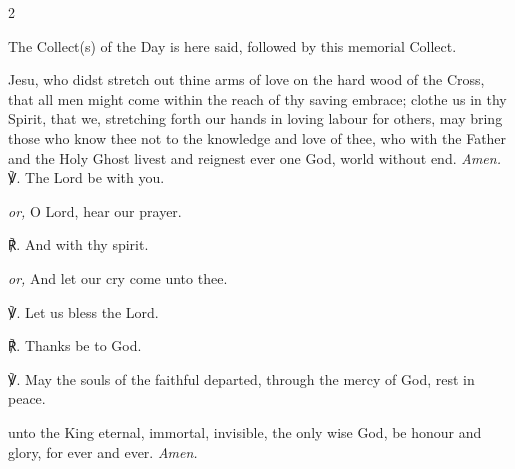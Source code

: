 \begin{multicols}{2}
\begin{rubric}
	The Collect(s) of the Day is here said, followed by this memorial Collect.
\end{rubric}

 Jesu, who didst stretch out thine arms of love on the hard wood of the Cross, that all men might come within the reach of thy saving embrace; clothe us in thy Spirit, that we, stretching forth our hands in loving labour for others, may bring those who know thee not to the knowledge and love of thee, who with the Father and the Holy Ghost livest and reignest ever one God, world without end. \textit{Amen.}\\

℣. The Lord be with you.\par
\textit{or,} O Lord, hear our prayer.

℟. And with thy spirit.\par
\textit{or,} And let our cry come unto thee.

℣. Let us bless the Lord.

℟. Thanks be to God.

℣. May the souls {} of the faithful departed, through the mercy of God, rest in peace.

 unto the King eternal, immortal, invisible, the only wise God, be honour and glory, for ever and ever. \textit{Amen.}

\end{multicols}


